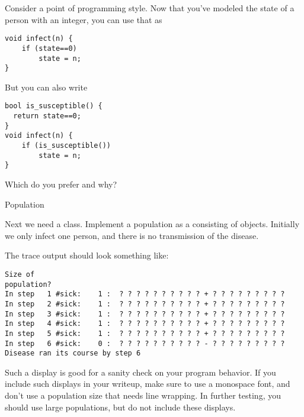 \begin{remark}
  Consider a point of programming style.
  Now that you've modeled the state of a person with an integer,
  you can use that as
\begin{lstlisting}
void infect(n) {
    if (state==0)
        state = n;
}
\end{lstlisting}
But you can also write
\begin{lstlisting}
bool is_susceptible() {
  return state==0;
}
void infect(n) {
    if (is_susceptible())
        state = n;
}
\end{lstlisting}
Which do you prefer and why?
\end{remark}

 {Population}

Next we need a  class. Implement a population as a 
consisting of  objects. Initially we only infect one person, and there
is no transmission of the disease.

The trace output should look something like:
\begin{verbatim}
Size of
population?
In step   1 #sick:    1 :  ? ? ? ? ? ? ? ? ? ? + ? ? ? ? ? ? ? ? ?
In step   2 #sick:    1 :  ? ? ? ? ? ? ? ? ? ? + ? ? ? ? ? ? ? ? ?
In step   3 #sick:    1 :  ? ? ? ? ? ? ? ? ? ? + ? ? ? ? ? ? ? ? ?
In step   4 #sick:    1 :  ? ? ? ? ? ? ? ? ? ? + ? ? ? ? ? ? ? ? ?
In step   5 #sick:    1 :  ? ? ? ? ? ? ? ? ? ? + ? ? ? ? ? ? ? ? ?
In step   6 #sick:    0 :  ? ? ? ? ? ? ? ? ? ? - ? ? ? ? ? ? ? ? ?
Disease ran its course by step 6
\end{verbatim}

\begin{remark}
  Such a display is good for a sanity check on your program behavior.
  If you include such displays
  in your writeup, make sure to use a monospace font, and don't use a population
  size that needs line wrapping. In further testing, you should use large populations,
  but do not include these displays.
\end{remark}

